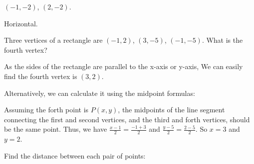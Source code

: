 \begin{questions}
\begin{tasks}
    \task $(-1, -2)$, $(2, -2)$.

    \begin{solution}
      Horizontal.
    \end{solution}

  \end{tasks}

  \item Three vertices of a rectangle are $(-1, 2)$, $(3, -5)$, $(-1, -5)$. What is the fourth vertex?

  \begin{solution}
    \begin{note}
    \end{note}

    As the sides of the rectangle are parallel to the x-axis or y-axis, We can easily find the fourth vertex is $(3, 2)$.

    Alternatively, we can calculate it using the midpoint formulas:

    Assuming the forth point is $P(x,y)$, the midpoints of the line segment connecting the first and second vertices, and the third and forth vertices, should be the same point. Thus, we have \(\frac{x-1}{2} = \frac{-1+3}{2} \) and \(\frac{y-5}{2} = \frac{2-5}{2}\). So $x=3$ and $y=2$.

  \end{solution}

  \item Find the distance between each pair of points: \label{sec_01_02:1}


\end{questions}

